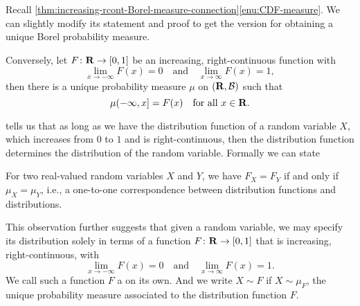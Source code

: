 Recall \cref{thm:increasing-rcont-Borel-measure-connection}\ref{enu:CDF-measure}. We can slightly modify its statement and proof to get the version for obtaining a unique Borel probability measure.

\begin{thm} \label{thm:CDF-measure-prob}
    Conversely, let $F\colon \mathbf{R}\to [0,1]$ be an increasing, right-continuous function with \[
        \lim_{x \to -\infty} F(x) = 0\quad \text{and} \quad \lim_{x \to \infty} F(x) = 1,
    \] then there is a unique probability measure $\mu$ on $(\mathbf{R},\mathcal{B})$ such that \[
        \mu(-\infty,x] = F(x) \quad \text{for all }x\in \mathbf{R}.
    \]
\end{thm}

 tells us that as long as we have the distribution function of a random variable $X$, which increases from $0$ to $1$ and is right-continuous, then the distribution function determines the distribution of the random variable. Formally we can state 
\begin{cor} \label{cor:dist-cdf-equiv}
    For two real-valued random variables $X$ and $Y$, we have $F_X = F_Y$ if and only if $\mu_X = \mu_Y$, i.e., a one-to-one correspondence between distribution functions and distributions.
\end{cor}

This observation further suggests that given a random variable, we may specify its distribution solely in terms of a function $F\colon \mathbf{R} \to [0,1]$ that is increasing, right-continuous, with \[
        \lim_{x \to -\infty} F(x) = 0\quad \text{and} \quad \lim_{x \to \infty} F(x) = 1.
\] We call such a function $F$ a  on its own. And we write $X \sim F$ if $X \sim \mu_F$, the unique probability measure associated to the distribution function $F$.

